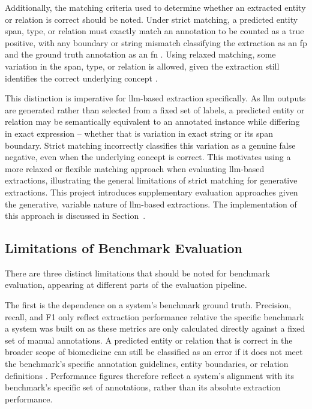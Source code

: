 Additionally, the matching criteria used to determine whether an extracted entity or relation is correct should be noted. Under strict matching, a predicted entity span, type, or relation must exactly match an annotation to be counted as a true positive, with any boundary or string mismatch classifying the extraction as an \gls{fp} and the ground truth annotation as an \gls{fn} \pref. Using relaxed matching, some variation in the span, type, or relation is allowed, given the extraction still identifies the correct underlying concept \pref.

This distinction is imperative for \gls{llm}-based extraction specifically. As \gls{llm} outputs are generated rather than selected from a fixed set of labels, a predicted entity or relation may be semantically equivalent to an annotated instance while differing in exact expression -- whether that is variation in exact string or its span boundary. Strict matching incorrectly classifies this variation as a genuine false negative, even when the underlying concept is correct. This motivates using a more relaxed or flexible matching approach when evaluating \gls{llm}-based extractions, illustrating the general limitations of strict matching for generative extractions. This project introduces supplementary evaluation approaches given the generative, variable nature of \gls{llm}-based extractions. The implementation of this approach is discussed in Section~\dep.

\subsection{Limitations of Benchmark Evaluation}
\label{subsec:lit:limitations_of_benchmark_eval}
There are three distinct limitations that should be noted for benchmark evaluation, appearing at different parts of the evaluation pipeline.

The first is the dependence on a system's benchmark ground truth. Precision, recall, and F1 only reflect extraction performance relative the specific benchmark a system was built on as these metrics are only calculated directly against a fixed set of manual annotations. A predicted entity or relation that is correct in the broader scope of biomedicine can still be classified as an error if it does not meet the benchmark's specific annotation guidelines, entity boundaries, or relation definitions \pref. Performance figures therefore reflect a system's alignment with its benchmark's specific set of annotations, rather than its absolute extraction performance.

